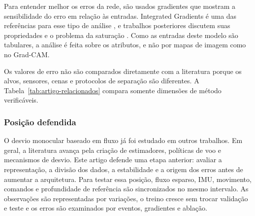 \documentclass[article,a4paper,12pt,brazil,sumario=tradicional]{abntex2}
\begin{document}
Para entender melhor os erros da rede, são usados gradientes que mostram a sensibilidade do erro em relação às entradas. Integrated Gradients é uma das referências para esse tipo de análise \cite{Sundararajan2017}, e trabalhos posteriores discutem suas propriedades e o problema da saturação \cite{Walker5289,Axiomatic2025}. Como as entradas deste modelo são tabulares, a análise é feita sobre os atributos, e não por mapas de imagem como no Grad-CAM.

Os valores de erro não são comparados diretamente com a literatura porque os alvos, sensores, cenas e protocolos de separação são diferentes. A Tabela~\ref{tab:artigo-relacionados} compara somente dimensões de método verificáveis.

\begin{table}[htb]
\centering
\caption{Comparação qualitativa com linhas de trabalhos relacionados.}
\label{tab:artigo-relacionados}
\end{table}

\subsubsection{Posição defendida}

O desvio monocular baseado em fluxo já foi estudado em outros trabalhos. Em geral, a literatura avança pela criação de estimadores, políticas de voo e mecanismos de desvio. Este artigo defende uma etapa anterior: avaliar a representação, a divisão dos dados, a estabilidade e a origem dos erros antes de aumentar a arquitetura. Para testar essa posição, fluxo esparso, IMU, movimento, comandos e profundidade de referência são sincronizados no mesmo intervalo. As observações são representadas por variações, o treino cresce sem trocar validação e teste e os erros são examinados por eventos, gradientes e ablação.
\end{document}
